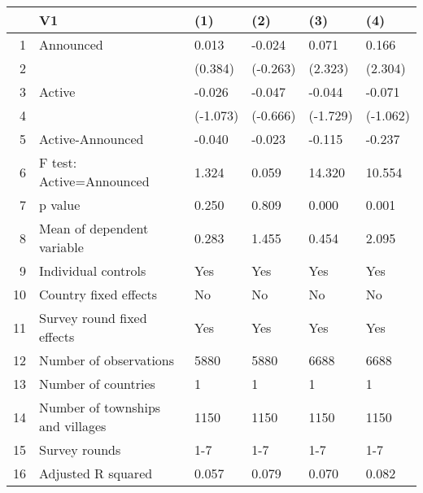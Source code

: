 \begin{table}[ht]
\centering
\begin{tabular}{rlllll}
  \hline
 & V1 & (1) & (2) & (3) & (4) \\ 
  \hline
1 & Announced & 0.013 & -0.024 & 0.071 & 0.166 \\ 
  2 &  & (0.384) & (-0.263) & (2.323) & (2.304) \\ 
  3 & Active & -0.026 & -0.047 & -0.044 & -0.071 \\ 
  4 &  & (-1.073) & (-0.666) & (-1.729) & (-1.062) \\ 
  5 & Active-Announced & -0.040 & -0.023 & -0.115 & -0.237 \\ 
  6 & F test: Active=Announced & 1.324 & 0.059 & 14.320 & 10.554 \\ 
  7 & p value & 0.250 & 0.809 & 0.000 & 0.001 \\ 
  8 & Mean of dependent variable & 0.283 & 1.455 & 0.454 & 2.095 \\ 
  9 & Individual controls & Yes & Yes & Yes & Yes \\ 
  10 & Country fixed effects & No & No & No & No \\ 
  11 & Survey round fixed effects & Yes & Yes & Yes & Yes \\ 
  12 & Number of observations & 5880 & 5880 & 6688 & 6688 \\ 
  13 & Number of countries & 1 & 1 & 1 & 1 \\ 
  14 & Number of townships and villages & 1150 & 1150 & 1150 & 1150 \\ 
  15 & Survey rounds & 1-7 & 1-7 & 1-7 & 1-7 \\ 
  16 & Adjusted R squared & 0.057 & 0.079 & 0.070 & 0.082 \\ 
   \hline
\end{tabular}
\end{table}
